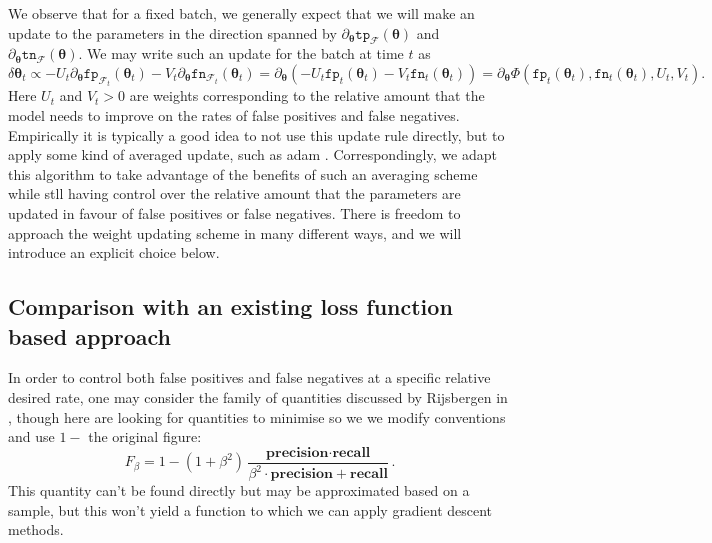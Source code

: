 \documentclass[10pt,a4paper]{article}
\begin{document}
We observe that for a fixed batch, we generally expect that we will make an update to the parameters in the direction spanned by $\partial_{\boldsymbol\theta}\texttt{tp}_{\mathcal F}(\boldsymbol\theta)$ and $\partial_{\boldsymbol\theta}\texttt{tn}_{\mathcal F}(\boldsymbol\theta)$.
We may write such an update for the batch at time $t$ as
$$
\delta\boldsymbol\theta_t\propto-U_t\partial_{\boldsymbol\theta}\texttt{fp}_{\mathcal F_t}(\boldsymbol\theta_t)-V_t\partial_{\boldsymbol\theta}\texttt{fn}_{\mathcal F_t}(\boldsymbol\theta_t)=\partial_{\boldsymbol\theta}(-U_t\texttt{fp}_t(\boldsymbol\theta_t)-V_t\texttt{fn}_t(\boldsymbol\theta_t))=\partial_{\boldsymbol\theta}\Phi(\texttt{fp}_t(\boldsymbol\theta_t),\texttt{fn}_t(\boldsymbol\theta_t),U_t,V_t).
$$
Here $U_t$ and $V_t>0$ are weights corresponding to the relative amount that the model needs to improve on the rates of false positives and false negatives.
Empirically it is typically a good idea to not use this update rule directly, but to apply some kind of averaged update, such as adam \cite{kingma2017adammethodstochasticoptimization}.
Correspondingly, we adapt this algorithm to take advantage of the benefits of such an averaging scheme while stll having control over the relative amount that the parameters are updated in favour of false positives or false negatives.
There is freedom to approach the weight updating scheme in many different ways, and we will introduce an explicit choice below.


\subsection{Comparison with an existing loss function based approach}

In order to control both false positives and false negatives at a specific relative desired rate, one may consider the family of quantities discussed by Rijsbergen in \cite{van1979information}, though here are looking for quantities to minimise so we we modify conventions and use $1-$ the original figure:
$$
F_\beta=1-(1+\beta^2)\frac{\textbf{precision}\cdot\textbf{recall}}{\beta^2\cdot\textbf{precision}+\textbf{recall}}.
$$
This quantity can't be found directly but may be approximated based on a sample, but this won't yield a function to which we can apply gradient descent methods.
\end{document}
